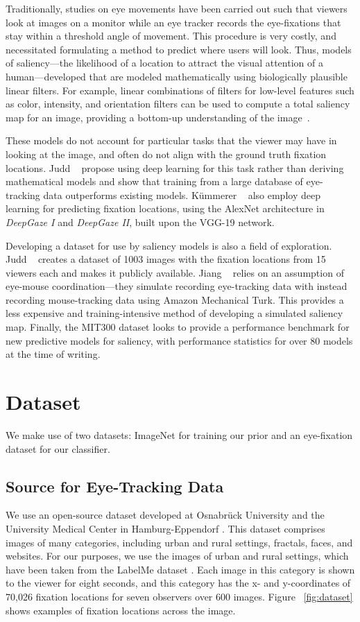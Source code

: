 \documentclass[10pt,twocolumn,letterpaper]{article}
\begin{document}
Traditionally, studies on eye movements have been carried out such that
viewers look at images on a monitor while an eye tracker records the
eye-fixations that stay within a threshold angle of movement. This procedure is
very costly, and necessitated formulating a method to predict where users will
look. Thus, models of saliency---the likelihood of a location to attract the
visual attention of a human---developed that are modeled mathematically using
biologically plausible linear filters. For example, linear combinations of
filters for low-level features such as color, intensity, and orientation
filters can be used to compute a total saliency map for an image,
providing a bottom-up understanding of the image~\cite{Itti}.

These models do not account for particular tasks that the viewer may have in
looking at the image, and often do not align with the ground truth fixation
locations. Judd \etal~\cite{Judd} propose using deep learning for this task
rather than deriving mathematical models and show that training from a large
database of eye-tracking data outperforms existing models. K\"ummerer
\etal~\cite{Kummerer} also employ deep learning for predicting fixation
locations, using the AlexNet architecture in \textit{DeepGaze I} and \textit{DeepGaze II}, built upon the VGG-19 network.

Developing a dataset for use by saliency models is also a field of exploration.
Judd \etal~\cite{Judd} creates a dataset of 1003 images with the fixation
locations from 15 viewers each and makes it publicly available. Jiang
\etal~\cite{Jiang} relies on an assumption of eye-mouse coordination---they
simulate recording eye-tracking data with instead recording mouse-tracking data
using Amazon Mechanical Turk. This provides a less expensive and
training-intensive method of developing a simulated saliency map. Finally, the
MIT300 dataset \cite{mitbench} looks to provide a performance benchmark for new predictive
models for saliency, with performance statistics for over 80 models at the time
of writing. 


\section{Dataset}
We make use of two datasets: ImageNet for training our prior and an
eye-fixation dataset for our classifier. 
\subsection{Source for Eye-Tracking Data}
We use an open-source dataset developed at Osnabr\"uck University and the
University Medical Center in Hamburg-Eppendorf \cite{Wilming01, Wilming02}. This dataset comprises images
of many categories, including urban and rural settings, fractals, faces, and
websites. For our purposes, we use the images of urban and rural settings,
which have been taken from the LabelMe dataset \cite{labelme}. Each image in
this category is shown to the viewer for eight seconds, and this category has
the x- and y-coordinates of 70,026 fixation locations for seven observers over
600 images. Figure ~\ref{fig:dataset} shows examples of fixation locations
across the image. 
\end{document}
